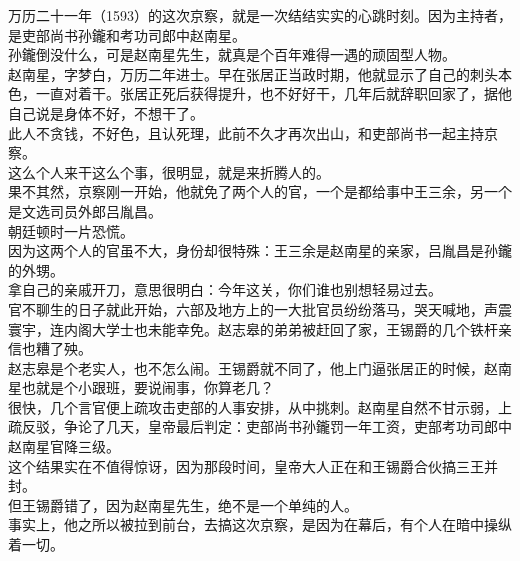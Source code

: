 \begin{multicols}{\theparacolNo}
万历二十一年（1593）的这次京察，就是一次结结实实的心跳时刻。因为主持者，是吏部尚书孙鑨和考功司郎中赵南星。\\

孙鑨倒没什么，可是赵南星先生，就真是个百年难得一遇的顽固型人物。\\

赵南星，字梦白，万历二年进士。早在张居正当政时期，他就显示了自己的刺头本色，一直对着干。张居正死后获得提升，也不好好干，几年后就辞职回家了，据他自己说是身体不好，不想干了。\\

此人不贪钱，不好色，且认死理，此前不久才再次出山，和吏部尚书一起主持京察。\\

这么个人来干这么个事，很明显，就是来折腾人的。\\

果不其然，京察刚一开始，他就免了两个人的官，一个是都给事中王三余，另一个是文选司员外郎吕胤昌。\\

朝廷顿时一片恐慌。\\

因为这两个人的官虽不大，身份却很特殊：王三余是赵南星的亲家，吕胤昌是孙鑨的外甥。\\

拿自己的亲戚开刀，意思很明白：今年这关，你们谁也别想轻易过去。\\

官不聊生的日子就此开始，六部及地方上的一大批官员纷纷落马，哭天喊地，声震寰宇，连内阁大学士也未能幸免。赵志皋的弟弟被赶回了家，王锡爵的几个铁杆亲信也糟了殃。\\

赵志皋是个老实人，也不怎么闹。王锡爵就不同了，他上门逼张居正的时候，赵南星也就是个小跟班，要说闹事，你算老几？\\

很快，几个言官便上疏攻击吏部的人事安排，从中挑刺。赵南星自然不甘示弱，上疏反驳，争论了几天，皇帝最后判定：吏部尚书孙鑨罚一年工资，吏部考功司郎中赵南星官降三级。\\

这个结果实在不值得惊讶，因为那段时间，皇帝大人正在和王锡爵合伙搞三王并封。\\

但王锡爵错了，因为赵南星先生，绝不是一个单纯的人。\\

事实上，他之所以被拉到前台，去搞这次京察，是因为在幕后，有个人在暗中操纵着一切。\\


\end{multicols}
